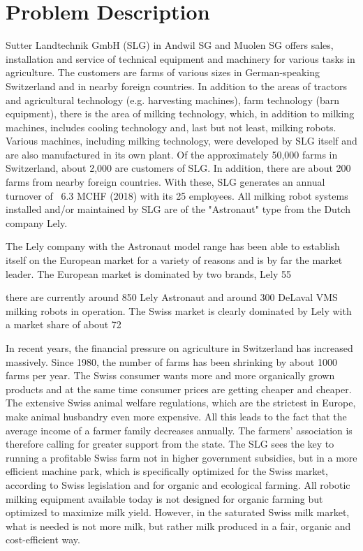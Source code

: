\section{Problem Description}\label{chap:1:problem}
Sutter Landtechnik GmbH (SLG) in Andwil SG and Muolen SG offers sales, installation and service of technical equipment and machinery for various tasks in agriculture. The customers are farms of various sizes in German-speaking Switzerland and in nearby foreign countries. In addition to the areas of tractors and agricultural technology (e.g. harvesting machines), farm technology (barn equipment), there is the area of milking technology, which, in addition to milking machines, includes cooling technology and, last but not least, milking robots. Various machines, including milking technology, were developed by SLG itself and are also manufactured in its own plant. Of the approximately 50,000 farms in Switzerland, about 2,000 are customers of SLG. In addition, there are about 200 farms from nearby foreign countries. With these, SLG generates an annual turnover of ~6.3 MCHF (2018) with its 25 employees. All milking robot systems installed and/or maintained by SLG are of the "Astronaut" type from the Dutch company Lely.

The Lely company with the Astronaut model range has been able to establish itself on the European market for a variety of reasons and is by far the market leader. The European market is dominated by two brands, Lely 55%

there are currently around 850 Lely Astronaut and around 300 DeLaval VMS milking robots in operation. The Swiss market is clearly dominated by Lely with a market share of about 72%

In recent years, the financial pressure on agriculture in Switzerland has increased massively. Since 1980, the number of farms has been shrinking by about 1000 farms per year. The Swiss consumer wants more and more organically grown products and at the same time consumer prices are getting cheaper and cheaper. The extensive Swiss animal welfare regulations, which are the strictest in Europe, make animal husbandry even more expensive. All this leads to the fact that the average income of a farmer family decreases annually. The farmers' association is therefore calling for greater support from the state. The SLG sees the key to running a profitable Swiss farm not in higher government subsidies, but in a more efficient machine park, which is specifically optimized for the Swiss market, according to Swiss legislation and for organic and ecological farming. All robotic milking equipment available today is not designed for organic farming but optimized to maximize milk yield. However, in the saturated Swiss milk market, what is needed is not more milk, but rather milk produced in a fair, organic and cost-efficient way.

